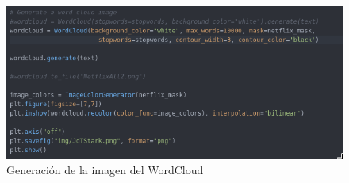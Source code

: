 \begin{figure}[H]
	\centering
	\includegraphics[scale=.5]{imagenes/generar-words.png}
	\caption{Generación de la imagen del WordCloud}
	\label{fig:generacion-words}
\end{figure}












